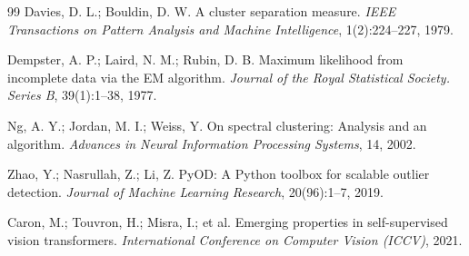 \documentclass[12pt,a4paper]{article}
\begin{document}
\begin{thebibliography}{99}
Davies, D. L.; Bouldin, D. W.
\newblock A cluster separation measure.
\newblock \textit{IEEE Transactions on Pattern Analysis and Machine Intelligence}, 1(2):224--227, 1979.

Dempster, A. P.; Laird, N. M.; Rubin, D. B.
\newblock Maximum likelihood from incomplete data via the EM algorithm.
\newblock \textit{Journal of the Royal Statistical Society. Series B}, 39(1):1--38, 1977.

Ng, A. Y.; Jordan, M. I.; Weiss, Y.
\newblock On spectral clustering: Analysis and an algorithm.
\newblock \textit{Advances in Neural Information Processing Systems}, 14, 2002.

Zhao, Y.; Nasrullah, Z.; Li, Z.
\newblock PyOD: A Python toolbox for scalable outlier detection.
\newblock \textit{Journal of Machine Learning Research}, 20(96):1--7, 2019.

Caron, M.; Touvron, H.; Misra, I.; et al.
\newblock Emerging properties in self-supervised vision transformers.
\newblock \textit{International Conference on Computer Vision (ICCV)}, 2021.

\end{thebibliography}
\end{document}

